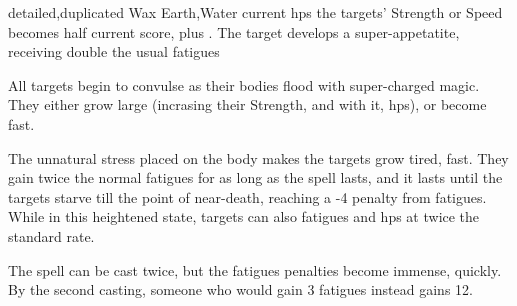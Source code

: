  {detailed,duplicated}%
  {Wax}%
  {Earth,Water}%
  {current \glspl{hp}}%
  {the targets' Strength or Speed becomes half current score, plus . The target develops a super-appetatite, receiving double the usual \glspl{fatigue}}%
  {
    All  targets begin to convulse as their bodies flood with super-charged magic.
    They either grow large (incrasing their Strength, and with it, \glspl{hp}), or become fast.

    The unnatural stress placed on the body makes the targets grow tired, fast.
    They gain twice the normal \glspl{fatigue} for as long as the spell lasts, and it lasts until the targets starve till the point of near-death, reaching a -4 penalty from \glspl{fatigue}.
    While in this heightened state, targets can also \glspl{fatigue} and \glspl{hp} at twice the standard rate.

    The spell can be cast twice, but the \glspl{fatigue} penalties become immense, quickly.
    By the second casting, someone who would gain 3 \glspl{fatigue} instead gains 12.
  }


